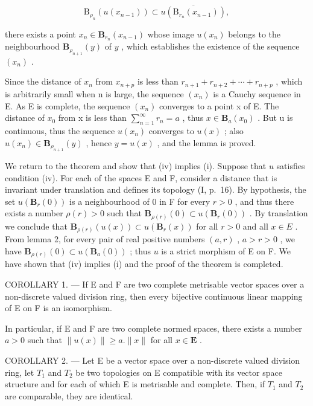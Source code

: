 \[
\mathrm{B} _ {\rho_ {n}} (u (x _ {n - 1})) \subset \overline {{u (\mathrm{B} _ {r _ {n}} (x _ {n - 1}))}},
\]

there exists a point \(x_{n} \in \mathbf{B}_{r_n}(x_{n-1})\) whose image \(u(x_{n})\) belongs to the neighbourhood \(\mathbf{B}_{\rho_{n+1}}(y)\) of \(y\) , which establishes the existence of the sequence \((x_{n})\) .

Since the distance of \(x_{n}\) from \(x_{n+p}\) is less than \(r_{n+1} + r_{n+2} + \cdots + r_{n+p}\) , which is arbitrarily small when n is large, the sequence \((x_{n})\) is a Cauchy sequence in E. As E is complete, the sequence \((x_{n})\) converges to a point x of E. The distance of \(x_{0}\) from x is less than \(\sum_{n=1}^{\infty} r_{n} = a\) , thus \(x \in \mathbf{B}_{a}(x_{0})\) . But u is continuous, thus the sequence \(u(x_{n})\) converges to \(u(x)\) ; also \(u(x_{n}) \in \mathbf{B}_{\rho_{n+1}}(y)\) , hence \(y = u(x)\) , and the lemma is proved.

We return to the theorem and show that (iv) implies (i). Suppose that \(u\) satisfies condition (iv). For each of the spaces E and F, consider a distance that is invariant under translation and defines its topology (I, p.~16). By hypothesis, the set \(u(\mathbf{B}_r(0))\) is a neighbourhood of 0 in F for every \(r > 0\) , and thus there exists a number \(\rho(r) > 0\) such that \(\mathbf{B}_{\rho(r)}(0) \subset u(\mathbf{B}_r(0))\) . By translation we conclude that \(\mathbf{B}_{\rho(r)}(u(x)) \subset u(\mathbf{B}_r(x))\) for all \(r > 0\) and all \(x \in E\) . From lemma 2, for every pair of real positive numbers \((a, r)\) , \(a > r > 0\) , we have \(\mathbf{B}_{\rho(r)}(0) \subset u(\mathbf{B}_a(0))\) ; thus \(u\) is a strict morphism of E on F. We have shown that (iv) implies (i) and the proof of the theorem is completed.

COROLLARY 1. --- If E and F are two complete metrisable vector spaces over a non-discrete valued division ring, then every bijective continuous linear mapping of E on F is an isomorphism.

In particular, if E and F are two complete normed spaces, there exists a number \(a > 0\) such that \(\| u(x)\| \geqslant a.\| x\|\) for all \(x\in \mathbf{E}\) .

COROLLARY 2. --- Let E be a vector space over a non-discrete valued division ring, let \(T_{1}\) and \(T_{2}\) be two topologies on E compatible with its vector space structure and for each of which E is metrisable and complete. Then, if \(T_{1}\) and \(T_{2}\) are comparable, they are identical.

